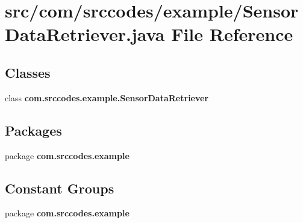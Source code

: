 \section{src/com/srccodes/example/\-Sensor\-Data\-Retriever.java File Reference}
\label{_sensor_data_retriever_8java}
\subsection*{Classes}
\begin{DoxyCompactItemize}
\item 
class {\bf com.\-srccodes.\-example.\-Sensor\-Data\-Retriever}
\end{DoxyCompactItemize}
\subsection*{Packages}
\begin{DoxyCompactItemize}
\item 
package {\bf com.\-srccodes.\-example}
\end{DoxyCompactItemize}
\subsection*{Constant Groups}
\begin{DoxyCompactItemize}
\item 
package {\bf com.\-srccodes.\-example}
\end{DoxyCompactItemize}
